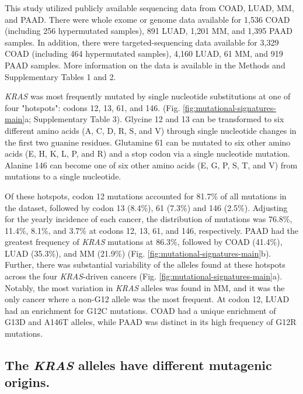 \documentclass[english, 10pt, letterpaper]{article}
\newcommand{\KRAS}{\emph{KRAS}}
\begin{document}
This study utilized publicly available sequencing data from COAD, LUAD, MM, and PAAD.
There were whole exome or genome data available for 1,536 COAD (including 256 hypermutated samples), 891 LUAD, 1,201 MM, and 1,395 PAAD samples.
In addition, there were targeted-sequencing data available for 3,329 COAD (including 464 hypermutated samples), 4,160 LUAD, 61 MM, and 919 PAAD samples.
More information on the data is available in the Methods and Supplementary Tables 1 and 2.

\KRAS{} was most frequently mutated by single nucleotide substitutions at one of four "hotspots": codons 12, 13, 61, and 146. (Fig. \ref{fig:mutational-signatures-main}a; Supplementary Table 3).
Glycine 12 and 13 can be transformed to six different amino acids (A, C, D, R, S, and V) through single nucleotide changes in the first two guanine residues.
Glutamine 61 can be mutated to six other amino acids (E, H, K, L, P, and R) and a stop codon via a single nucleotide mutation.
Alanine 146 can become one of six other amino acids (E, G, P, S, T, and V) from mutations to a single nucleotide.

Of these hotspots, codon 12 mutations accounted for 81.7\% of all mutations in the dataset, followed by codon 13 (8.4\%), 61 (7.3\%) and 146 (2.5\%).
Adjusting for the yearly incidence of each cancer, the distribution of mutations was 76.8\%, 11.4\%, 8.1\%, and 3.7\% at codons 12, 13, 61, and 146, respectively.
PAAD had the greatest frequency of \KRAS{} mutations at 86.3\%, followed by COAD (41.4\%), LUAD (35.3\%), and MM (21.9\%) (Fig. \ref{fig:mutational-signatures-main}b).
Further, there was substantial variability of the alleles found at these hotspots across the four \KRAS{}-driven cancers (Fig. \ref{fig:mutational-signatures-main}a). 
Notably, the most variation in \KRAS{} alleles was found in MM, and it was the only cancer where a non-G12 allele was the most frequent.
At codon 12, LUAD had an enrichment for G12C mutations.
COAD had a unique enrichment of G13D and A146T alleles, while PAAD was distinct in its high frequency of G12R mutations.


\subsection*{The \KRAS{} alleles have different mutagenic origins.}
\end{document}
